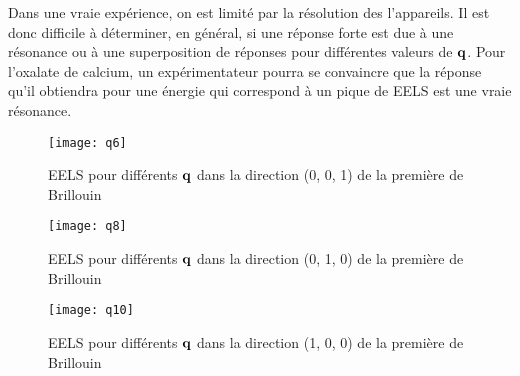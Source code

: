 Dans une vraie expérience, on est limité par la résolution des l'appareils.
Il est donc difficile à déterminer, en général, si une réponse forte est due
à une résonance ou à une superposition de réponses pour différentes valeurs de $\vb{q}$.
Pour l'oxalate de calcium, un expérimentateur pourra se convaincre que la réponse qu'il obtiendra
pour une énergie qui correspond à un pique de EELS est une vraie résonance.


\begin{figure}[!h]\label{fig-q6}
    \centering
    \texttt{[image: q6]}
    \caption{EELS pour différents $\vb{q}$ dans la direction (0, 0, 1) de la première de Brillouin}
\end{figure}

\begin{figure}[!h]\label{fig-q8}
    \centering
    \texttt{[image: q8]}
    \caption{EELS pour différents $\vb{q}$ dans la direction (0, 1, 0) de la première de Brillouin}
\end{figure}
\begin{figure}[!h]\label{fig-q10}
    \centering
    \texttt{[image: q10]}
    \caption{EELS pour différents $\vb{q}$ dans la direction (1, 0, 0) de la première de Brillouin}
\end{figure}
